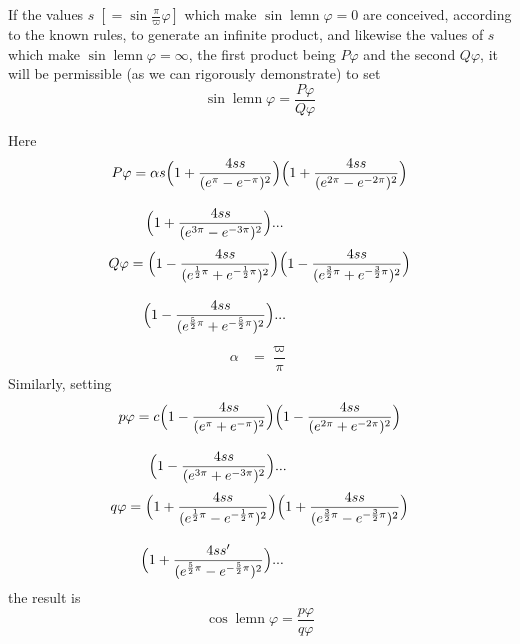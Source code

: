 \begingroup
\renewcommand{\arraystretch}{1.45}
If the values $s\;[=\sin\frac{\pi}{\varpi}\varphi]$ which make $\sin\operatorname{lemn}\varphi=0$ are conceived, according to the known rules, to generate an infinite product, and likewise the values of $s$ which make $\sin\operatorname{lemn}\varphi=\infty$, the first product being $P\varphi$ and the second $Q\varphi$, it will be permissible (as we can rigorously demonstrate) to set
\[
\sin\operatorname{lemn}\varphi=\dfrac{P\varphi}{Q\varphi}
\]


\noindent Here
\[
\begin{aligned}P\varphi &=\alpha s
 \Bigl(1+\dfrac{4ss}{(e^{\pi}-e^{-\pi})^{2}}\Bigr)
 \Bigl(1+\dfrac{4ss}{(e^{2\pi}-e^{-2\pi})^{2}}\Bigr)
 \\[9pt]&\quad{}\Bigl(1+\dfrac{4ss}{(e^{3\pi}-e^{-3\pi})^{2}}\Bigr)\mathord{.}\mathord{.}\mathord{.}\end{aligned}
\]
\[
\begin{aligned}Q\varphi &=
 \Bigl(1-\dfrac{4ss}{(e^{\frac12\pi}+e^{-\frac12\pi})^{2}}\Bigr)
 \Bigl(1-\dfrac{4ss}{(e^{\frac32\pi}+e^{-\frac32\pi})^{2}}\Bigr)
 \\[9pt]&\quad{}\Bigl(1-\dfrac{4ss}{(e^{\frac52\pi}+e^{-\frac52\pi})^{2}}\Bigr)\mathord{.}\mathord{.}\mathord{.}\end{aligned}
\]
\[
\begin{aligned}\alpha &=\dfrac{\varpi}{\pi}\end{aligned}
\]
Similarly, setting
\[
\begin{aligned}p\varphi &=c
 \Bigl(1-\dfrac{4ss}{(e^{\pi}+e^{-\pi})^{2}}\Bigr)
 \Bigl(1-\dfrac{4ss}{(e^{2\pi}+e^{-2\pi})^{2}}\Bigr)
 \\[9pt]&\quad{}\Bigl(1-\dfrac{4ss}{(e^{3\pi}+e^{-3\pi})^{2}}\Bigr)\mathord{.}\mathord{.}\mathord{.}\end{aligned}
\]
\[
\begin{aligned}q\varphi &=
 \Bigl(1+\dfrac{4ss}{(e^{\frac12\pi}-e^{-\frac12\pi})^{2}}\Bigr)
 \Bigl(1+\dfrac{4ss}{(e^{\frac32\pi}-e^{-\frac32\pi})^{2}}\Bigr)
 \\[9pt]&\quad{}\Bigl(1+\dfrac{4ss'}{(e^{\frac52\pi}-e^{-\frac52\pi})^{2}}\Bigr)\mathord{.}\mathord{.}\mathord{.}\end{aligned}
\]
\noindent the result is
\[
\cos\operatorname{lemn}\varphi=\dfrac{p\varphi}{q\varphi}
\]
